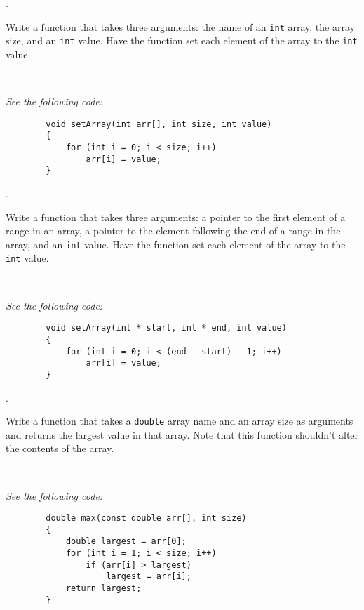 \documentclass{amsart}
\begin{document}
. 
\begin{minipage}[t]{11.5 cm}
	Write a function that takes three arguments: the name of an \texttt{int} array, the array size, and an \texttt{int} value. Have the function set each element of the array to the \texttt{int} value. 
\end{minipage} \\[1ex]
\phantom{3. } 
\begin{minipage}[t]{11.5 cm}
	{\slshape See the following code:}
	\begin{verbatim}
		void setArray(int arr[], int size, int value)
		{
		    for (int i = 0; i < size; i++)
		        arr[i] = value;
		}
	\end{verbatim} 
\end{minipage} 
\vfill
\newpage

\vfill
{}. 
\begin{minipage}[t]{11.5 cm}
	Write a function that takes three arguments: a pointer to the first element of a range in an array, a pointer to the element following the end of a range in the array, and an \texttt{int} value. Have the function set each element of the array to the \texttt{int} value. 
\end{minipage} \\[1ex]
\phantom{2. } 
\begin{minipage}[t]{11.5 cm}
	{\slshape See the following code:}
	\begin{verbatim}
		void setArray(int * start, int * end, int value)
		{
		    for (int i = 0; i < (end - start) - 1; i++)
		        arr[i] = value;
		}
	\end{verbatim} 
\end{minipage} 
\vfill

. 
\begin{minipage}[t]{11.5 cm}
	Write a function that takes a \verb+double+ array name and an array size as arguments and returns the largest value in that array. Note that this function shouldn't alter the contents of the array.
\end{minipage} \\[1ex]
\phantom{3. } 
\begin{minipage}[t]{11.5 cm}
	{\slshape See the following code:}
	\begin{verbatim}
		double max(const double arr[], int size)
		{
		    double largest = arr[0];
		    for (int i = 1; i < size; i++)
		        if (arr[i] > largest)
		            largest = arr[i];
		    return largest;
		}
	\end{verbatim} 
\end{minipage} 
\vfill
\end{document}
